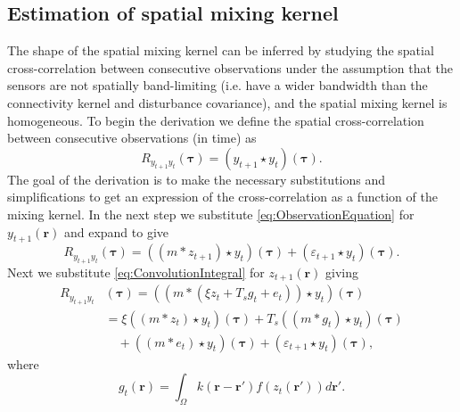 \documentclass[10pt,twocolumn,twoside]{IEEEtran}
\begin{document}
\subsection{Estimation of spatial mixing kernel} 
The shape of the spatial mixing kernel can be inferred by studying the spatial cross-correlation between consecutive observations under the assumption that the sensors are not spatially band-limiting (i.e. have a wider bandwidth than the connectivity kernel and disturbance covariance), and the spatial mixing kernel is homogeneous.  To begin the derivation we define the spatial cross-correlation between consecutive observations (in time) as  
\begin{equation}
	R_{y_{t+1}y_t}(\boldsymbol{\tau}) = \left(y_{t+1}\star y_t\right)\left(\boldsymbol{\tau}\right).
\end{equation}
The goal of the derivation is to make the necessary substitutions and simplifications to get an expression of the cross-correlation as a function of the mixing kernel. In the next step we substitute \eqref{eq:ObservationEquation} for $y_{t+1}(\mathbf{r})$ and expand to give
\begin{equation}
	R_{y_{t+1}y_t}\left(\boldsymbol{\tau}\right) = \left(\left(m \ast z_{t+1}\right)\star y_t\right)\left(\boldsymbol{\tau}\right) + \left(\varepsilon_{t+1} \star y_t\right)\left(\boldsymbol{\tau}\right).
\end{equation}
Next we substitute \eqref{eq:ConvolutionIntegral} for $z_{t+1}(\mathbf{r})$ giving 
\begin{align}
	R_{y_{t+1}y_t}&(\boldsymbol{\tau}) = (\left(m \ast \left(\xi z_t +  T_s g_t + e_t\right)\right) \star y_t)(\boldsymbol{\tau}) \nonumber\\
	&= \xi\left(\left(m \ast z_t\right) \star y_t \right)(\boldsymbol{\tau})+ T_s \left(\left(m\ast g_t\right)\star y_t \right)(\boldsymbol{\tau}) \nonumber\\
	&\quad+ \left(\left(m\ast e_t\right)\star y_t \right)(\boldsymbol{\tau})+ (\varepsilon_{t+1} \star y_t)(\boldsymbol{\tau}),
\end{align}
where
\begin{equation}\label{eq:averagefiringrate}
	g_t(\mathbf r)=\int_{\Omega}k\left(\mathbf{r}-\mathbf{r}'\right)f(z_{t}\left(\mathbf{r}'\right))d\mathbf{r}'.
\end{equation}
\end{document}

